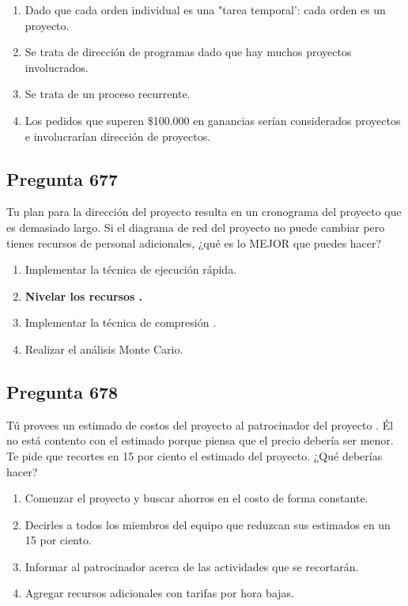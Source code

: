 \documentclass[11pt,a4paper]{article}
\begin{document}
\begin{enumerate}[label=\alph*)]
  \item Dado que cada orden individual es una "tarea temporal': cada orden es un proyecto.
  \item Se trata de dirección de programas dado que hay muchos proyectos involucrados.
  \item Se trata de un proceso recurrente.
  \item Los pedidos que superen \$100.000 en ganancias serían considerados proyectos e involucrarían dirección de proyectos.
\end{enumerate}

\subsection*{Pregunta 677}
Tu plan para la dirección del proyecto resulta en un cronograma del proyecto que es demasiado largo. Si el diagrama de red del proyecto no puede cambiar pero tienes recursos de personal adicionales, ¿qué es lo MEJOR que puedes hacer?

\begin{enumerate}[label=\alph*)]
  \item Implementar la técnica de ejecución rápida.
  \item \textbf{Nivelar los recursos .}
  \item Implementar la técnica de compresión .
  \item Realizar el análisis Monte Cario.
\end{enumerate}

\subsection*{Pregunta 678}
Tú provees un estimado de costos del proyecto al patrocinador del proyecto . Él no está contento con el estimado porque piensa que el precio debería ser menor. Te pide que recortes en 15 por ciento el estimado del proyecto. ¿Qué deberías hacer?

\begin{enumerate}[label=\alph*)]
  \item Comenzar el proyecto y buscar ahorros en el costo de forma constante.
  \item Decirles a todos los miembros del equipo que reduzcan sus estimados en un 15 por ciento.
  \item Informar al patrocinador acerca de las actividades que se recortarán.
  \item Agregar recursos adicionales con tarifas por hora bajas.
\end{enumerate}
\end{document}
